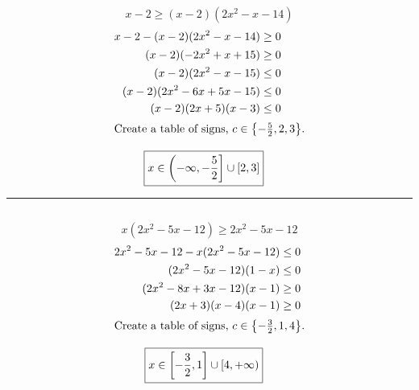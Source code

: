 	\subsection{}
		\[x - 2 \geq (x - 2)(2x^2 - x - 14)\]
		\begin{align*}
			x - 2 - (x - 2)(2x^2 - x - 14) &\geq 0 \\
			(x - 2)(-2x^2 + x + 15) &\geq 0 \\
			(x - 2)(2x^2 - x - 15) &\leq 0 \\
			(x - 2)(2x^2 - 6x + 5x - 15) &\leq 0 \\
			(x - 2)(2x + 5)(x - 3) &\leq 0 \\
			\intertext{Create a table of signs, $c \in \left\{-\frac{5}{2}, 2, 3\right\}$.}
		\end{align*}
		\begin{center}\end{center}
		\begin{align*}
			\Aboxed{x &\in \left(-\infty, -\frac{5}{2}\right] \cup [2, 3]}
		\end{align*}
		\hrule{}

	\subsection{}
		\[x(2x^2 - 5x - 12) \geq 2x^2 - 5x - 12\]
		\begin{align*}
			2x^2 - 5x - 12 - x(2x^2 - 5x - 12) &\leq 0 \\
			(2x^2 - 5x - 12)(1 - x) &\leq 0 \\
			(2x^2 - 8x + 3x - 12)(x - 1) &\geq 0 \\
			(2x + 3)(x - 4)(x - 1) &\geq 0 \\
			\intertext{Create a table of signs, $c \in \left\{-\frac{3}{2}, 1, 4\right\}$.}
		\end{align*}
		\begin{center}\end{center}
		\begin{align*}
			\Aboxed{x &\in \left[-\frac{3}{2}, 1\right] \cup [4, +\infty)}
		\end{align*}

